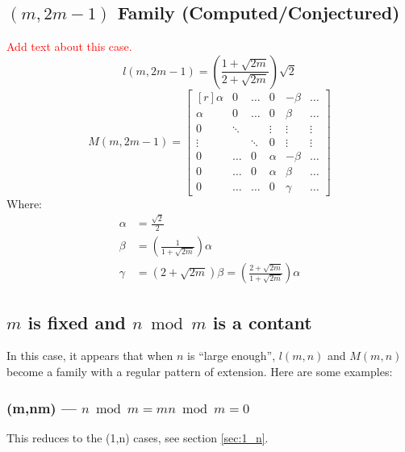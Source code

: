 \documentclass[12pt,titlepage]{article}
\begin{document}
\subsection{$(m,2m-1)$ Family (Computed/Conjectured)}
\label{sec:m_2m-1}
\textcolor{red}{
Add text about this case.
}
\begin{equation*}
l(m,2m-1) = \left(\frac{1 + \sqrt{2m}}{2 + \sqrt{2m}}\right) \sqrt{2}
\end{equation*}
\begin{equation*}
M(m,2m-1) =
\begin{bmatrix*}[r]
\alpha & 0      & \ldots & 0      & -\beta  & \ldots \\
\alpha & 0      & \ldots & 0      &  \beta  & \ldots \\
0      & \ddots &        & \vdots & \vdots   & \vdots \\
\vdots &        & \ddots & 0      & \vdots   & \vdots \\
0      & \ldots & 0      & \alpha & -\beta  & \ldots \\
0      & \ldots & 0      & \alpha &  \beta  & \ldots \\
0      & \ldots & \ldots & 0      &  \gamma & \ldots
\end{bmatrix*}
\end{equation*}
Where:
\begin{align*}
\alpha &= \frac{\sqrt{2}}{2}                          \\
\beta  &= \left(\frac{1}{1 + \sqrt{2m}}\right) \alpha \\
\gamma &= \left(2 + \sqrt{2m}\right) \beta 
        = \left(\frac{2 + \sqrt{2m}}{1 + \sqrt{2m}}\right) \alpha
\end{align*}

\subsection{$m$ is fixed and $n \bmod m$ is a contant}

In this case, it appears that when $n$ is ``large enough'', $l(m,n)$ and
$M(m,n)$ become a family with a regular pattern of extension.  Here are some
examples:

\subsubsection{(m,nm) --- $n \bmod m = mn \bmod m = 0$}
This reduces to the (1,n) cases, see section \ref{sec:1_n}.
\end{document}
